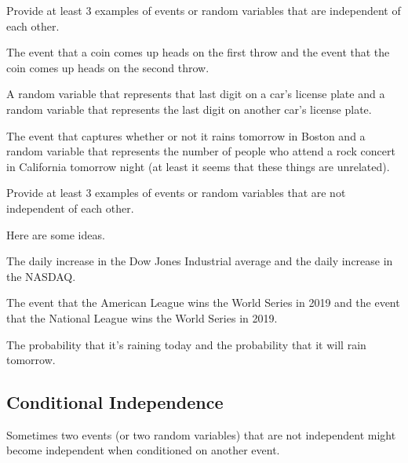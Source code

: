 \documentclass[assignment02_Solutions]{subfiles}
\begin{document}
\begin{exercise}[(10 minutes)]
\bes
\item Provide at least 3 examples of events or random variables that are independent of each other.

\begin{boxedsolution}
\bi
\item The event that a coin comes up heads on the first throw and the event that the coin comes up heads on the second throw.
\item A random variable that represents that last digit on a car's license plate and a random variable that represents the last digit on another car's license plate.
\item The event that captures whether or not it rains tomorrow in Boston and a random variable that represents the number of people who attend a rock concert in California tomorrow night (at least it seems that these things are unrelated).
\ei
\end{boxedsolution}

\item Provide at least 3 examples of events or random variables that are not independent of each other.

\begin{boxedsolution}
Here are some ideas.
\bi
\item The daily increase in the Dow Jones Industrial average and the daily increase in the NASDAQ.
\item The event that the American League wins the World Series in 2019 and the event that the National League wins the World Series in 2019.
\item The probability that it's raining today and the probability that it will rain tomorrow.
\ei
\end{boxedsolution}

\ees
\end{exercise}

\subsection{Conditional Independence}
Sometimes two events (or two random variables) that are not independent might become independent when conditioned on another event.
\end{document}
